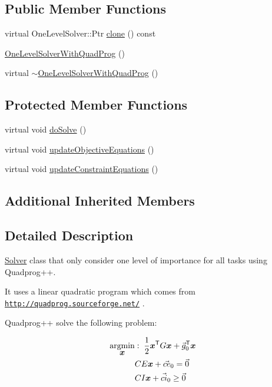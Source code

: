 \subsection*{Public Member Functions}
\begin{DoxyCompactItemize}
\item 
virtual One\+Level\+Solver\+::\+Ptr \hyperlink{classocra_1_1OneLevelSolverWithQuadProg_a706e7772885ae7ab3e78565d51286eac}{clone} () const
\item 
\hyperlink{classocra_1_1OneLevelSolverWithQuadProg_a0d7f639dd36c79056c264f0c09d5be50}{One\+Level\+Solver\+With\+Quad\+Prog} ()
\item 
virtual \hyperlink{classocra_1_1OneLevelSolverWithQuadProg_a27d12b82fcaec15ca7041064bd7f9095}{$\sim$\+One\+Level\+Solver\+With\+Quad\+Prog} ()
\end{DoxyCompactItemize}
\subsection*{Protected Member Functions}
\begin{DoxyCompactItemize}
\item 
virtual void \hyperlink{classocra_1_1OneLevelSolverWithQuadProg_aa6e7517459ef68106e83a7f0dc09c977}{do\+Solve} ()
\item 
virtual void \hyperlink{classocra_1_1OneLevelSolverWithQuadProg_a3c36b4620ee75c8f6c104244350087c2}{update\+Objective\+Equations} ()
\item 
virtual void \hyperlink{classocra_1_1OneLevelSolverWithQuadProg_a0276b1005f8b5812b313aa594d01118a}{update\+Constraint\+Equations} ()
\end{DoxyCompactItemize}
\subsection*{Additional Inherited Members}


\subsection{Detailed Description}
\hyperlink{classocra_1_1Solver}{Solver} class that only consider one level of importance for all tasks using Quadprog++. 

It uses a linear quadratic program which comes from \href{http://quadprog.sourceforge.net/}{\tt http\+://quadprog.\+sourceforge.\+net/} .

Quadprog++ solve the following problem\+:

\begin{align*} \underset{\mbox{\boldmath${x}$}}{\operatorname{argmin}} &: \; \frac{1}{2} \mbox{\boldmath${x}$}^{\mathsf{T}} G \mbox{\boldmath${x}$} + \vec{g}_0^{\mathsf{T}} \mbox{\boldmath${x}$} \\ & CE \mbox{\boldmath${x}$} + \vec{ce}_0 = \vec{0} \\ & CI \mbox{\boldmath${x}$} + \vec{ci}_0 \geq \vec{0} \end{align*} 

